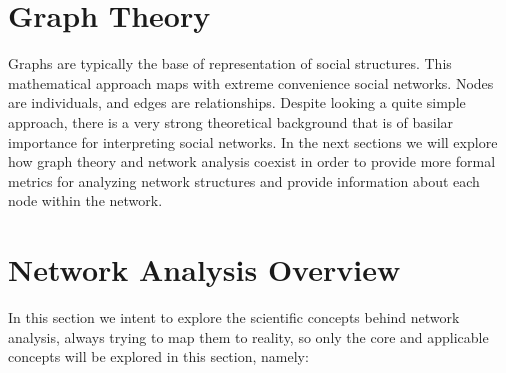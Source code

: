 \section{Graph Theory}
Graphs are typically the base of representation of social structures. This mathematical approach maps with  extreme convenience social networks. Nodes are individuals, and edges are relationships. Despite looking a quite simple approach, there is a very strong theoretical background that is of basilar importance for interpreting social networks. In the next sections we will explore how graph theory and network analysis coexist in order to provide more formal metrics for analyzing network structures and provide information about each node within the network.

\section{Network Analysis Overview}
In this section we intent to explore the scientific concepts behind network analysis, always trying to map them to reality, so only the core
and applicable concepts will be explored in this section, namely:

